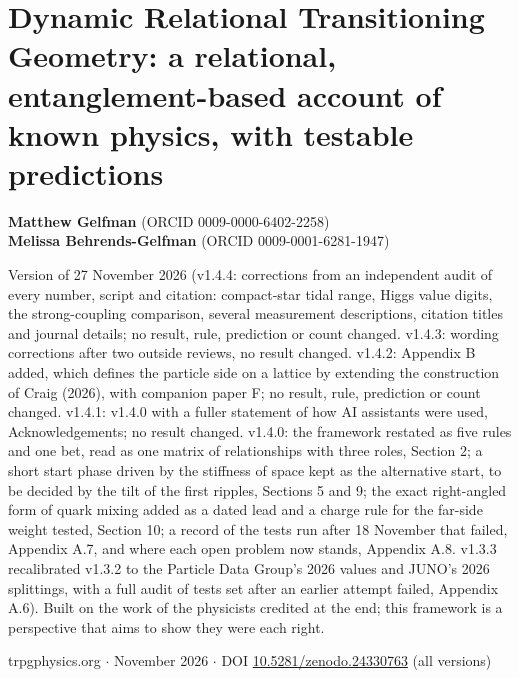 \documentclass[
  11pt,
]{article}
\author{}
\date{}
\begin{document}
\hypertarget{dynamic-relational-transitioning-geometry-a-relational-entanglement-based-account-of-known-physics-with-testable-predictions}{%
\section{Dynamic Relational Transitioning Geometry: a relational, entanglement-based account of known physics, with testable predictions}\label{dynamic-relational-transitioning-geometry-a-relational-entanglement-based-account-of-known-physics-with-testable-predictions}}

\textbf{Matthew Gelfman} (ORCID 0009-0000-6402-2258)\\
\textbf{Melissa Behrends-Gelfman} (ORCID 0009-0001-6281-1947)

Version of 27 November 2026 (v1.4.4: corrections from an independent audit of every number, script and citation: compact-star tidal range, Higgs value digits, the strong-coupling comparison, several measurement descriptions, citation titles and journal details; no result, rule, prediction or count changed. v1.4.3: wording corrections after two outside reviews, no result changed. v1.4.2: Appendix B added, which defines the particle side on a lattice by extending the construction of Craig (2026), with companion paper F; no result, rule, prediction or count changed. v1.4.1: v1.4.0 with a fuller statement of how AI assistants were used, Acknowledgements; no result changed. v1.4.0: the framework restated as five rules and one bet, read as one matrix of relationships with three roles, Section 2; a short start phase driven by the stiffness of space kept as the alternative start, to be decided by the tilt of the first ripples, Sections 5 and 9; the exact right-angled form of quark mixing added as a dated lead and a charge rule for the far-side weight tested, Section 10; a record of the tests run after 18 November that failed, Appendix A.7, and where each open problem now stands, Appendix A.8. v1.3.3 recalibrated v1.3.2 to the Particle Data Group's 2026 values and JUNO's 2026 splittings, with a full audit of tests set after an earlier attempt failed, Appendix A.6). Built on the work of the physicists credited at the end; this framework is a perspective that aims to show they were each right.

trpgphysics.org \ensuremath{\cdot} November 2026 \ensuremath{\cdot} DOI \href{https://doi.org/10.5281/zenodo.24330763}{10.5281/zenodo.24330763} (all versions)
\end{document}
